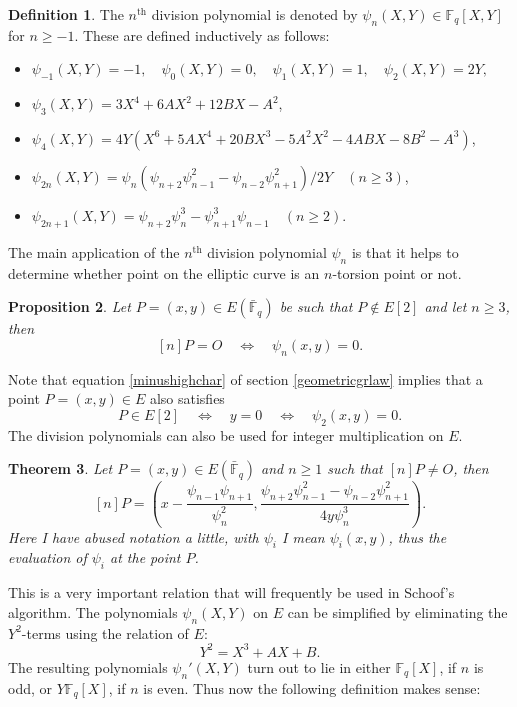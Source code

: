\documentclass{article}
\numberwithin{equation}{section}
\newtheorem{theorem}{Theorem}[subsection]
\newtheorem{proposition}[theorem]{Proposition}
\theoremstyle{definition}
\newtheorem{definition}[theorem]{Definition}
\newcommand{\FF}[1]{{\mathbb F}_{#1}} %
\newcommand{\FFCL}[1]{{\bar {\mathbb F}}_{#1}} %
\begin{document}
\begin{definition}\label{divpol}
The $n^\text{th}$ division polynomial is denoted by $\psi_n(X,Y) \in \FF{q}[X,Y]$ for $n \geq -1$. These are defined inductively as follows:
\begin{itemize}
\item $\psi_{-1}(X,Y)=-1,\quad \psi_0(X,Y)=0,\quad \psi_1(X,Y)=1,\quad \psi_2(X,Y)=2Y,$
\item $\psi_3(X,Y)=3X^4+6AX^2+12BX-A^2$,
\item $\psi_4(X,Y)=4Y(X^6+5AX^4+20BX^3-5A^2X^2-4ABX-8B^2-A^3)$,
\item $\psi_{2n}(X,Y)=\psi_n(\psi_{n+2}\psi_{n-1}^2-\psi_{n-2}\psi_{n+1}^2)/2Y \quad (n \geq 3)$,
\item $\psi_{2n+1}(X,Y)=\psi_{n+2}\psi_n^3-\psi_{n+1}^3\psi_{n-1} \quad (n \geq 2)$.
\end{itemize}
\end{definition}

The main application of the $n^\text{th}$ division polynomial $\psi_n$ is that it helps to determine whether point on the elliptic curve is an $n$-torsion point or not.

\begin{proposition}\label{divpoldeterminetorsion}
Let $P=(x,y) \in E(\FFCL{q})$ be such that $P \not\in E[2]$ and let $n \geq 3$, then $$[n]P = O \quad \Leftrightarrow \quad \psi_n(x,y)=0.$$
\end{proposition}

Note that equation \ref{minushighchar} of section \ref{geometricgrlaw} implies that a point $P=(x,y) \in E$ also satisfies $$P \in E[2] \quad \Leftrightarrow \quad y = 0 \quad \Leftrightarrow \quad \psi_2(x,y)=0.$$
The division polynomials can also be used for integer multiplication on $E$. 

\begin{theorem}\label{divpolmult}
Let $P = (x,y) \in E(\FFCL{q})$ and $n \geq 1$ such that $[n]P \neq O$, then 
$$[n]P=\left ( x-\frac{\psi_{n-1}\psi_{n+1}}{\psi_n^2},\frac{\psi_{n+2}\psi_{n-1}^2 - \psi_{n-2}\psi_{n+1}^2}{4y\psi_n^3}\right).$$ Here I have abused notation a little, with $\psi_i$ I mean $\psi_i(x,y)$, thus the evaluation of $\psi_i$ at the point $P$.
\end{theorem}

This is a very important relation that will frequently be used in Schoof's algorithm. The polynomials $\psi_n(X,Y)$ on $E$ can be simplified by eliminating the $Y^2$-terms using the relation of $E$: \begin{equation}\label{ellcurveschoof}Y^2=X^3+AX+B.\end{equation} The resulting polynomials $\psi_n'(X,Y)$ turn out to lie in either $\FF{q}[X]$, if $n$ is odd, or $Y\FF{q}[X]$, if $n$ is even. Thus now the following definition makes sense:
\end{document}
